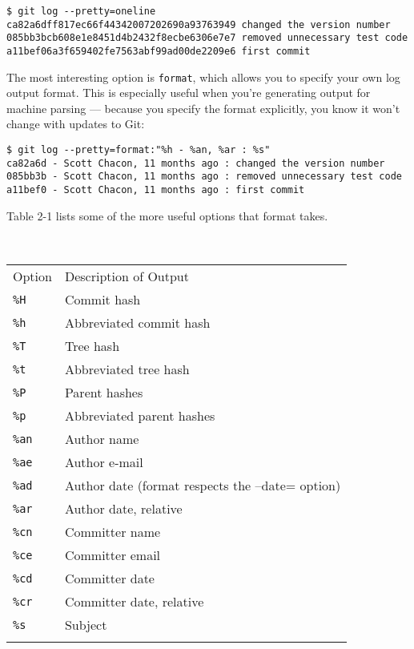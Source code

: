 \documentclass[a4paper]{book}
\newcounter{tab}[chapter]
\begin{document}
\begin{shaded}\begin{verbatim}
$ git log --pretty=oneline
ca82a6dff817ec66f44342007202690a93763949 changed the version number
085bb3bcb608e1e8451d4b2432f8ecbe6306e7e7 removed unnecessary test code
a11bef06a3f659402fe7563abf99ad00de2209e6 first commit
\end{verbatim}\end{shaded}

The most interesting option is \texttt{format}, which allows you to specify your own log output format. This is especially useful when you're generating output for machine parsing --- because you specify the format explicitly, you know it won't change with updates to Git:

\begin{shaded}\begin{verbatim}
$ git log --pretty=format:"%h - %an, %ar : %s"
ca82a6d - Scott Chacon, 11 months ago : changed the version number
085bb3b - Scott Chacon, 11 months ago : removed unnecessary test code
a11bef0 - Scott Chacon, 11 months ago : first commit
\end{verbatim}\end{shaded}

Table 2-1 lists some of the more useful options that format takes.

\begin{longtable}[c]{@{}lp{10cm}@{}}
\caption{~}\\
\toprule\addlinespace
Option & Description of Output
\\\addlinespace
\midrule\endhead
\texttt{\%H} & Commit hash
\\\addlinespace
\texttt{\%h} & Abbreviated commit hash
\\\addlinespace
\texttt{\%T} & Tree hash
\\\addlinespace
\texttt{\%t} & Abbreviated tree hash
\\\addlinespace
\texttt{\%P} & Parent hashes
\\\addlinespace
\texttt{\%p} & Abbreviated parent hashes
\\\addlinespace
\texttt{\%an} & Author name
\\\addlinespace
\texttt{\%ae} & Author e-mail
\\\addlinespace
\texttt{\%ad} & Author date (format respects the --date= option)
\\\addlinespace
\texttt{\%ar} & Author date, relative
\\\addlinespace
\texttt{\%cn} & Committer name
\\\addlinespace
\texttt{\%ce} & Committer email
\\\addlinespace
\texttt{\%cd} & Committer date
\\\addlinespace
\texttt{\%cr} & Committer date, relative
\\\addlinespace
\texttt{\%s} & Subject
\\\addlinespace
\bottomrule
\end{longtable}
\end{document}
